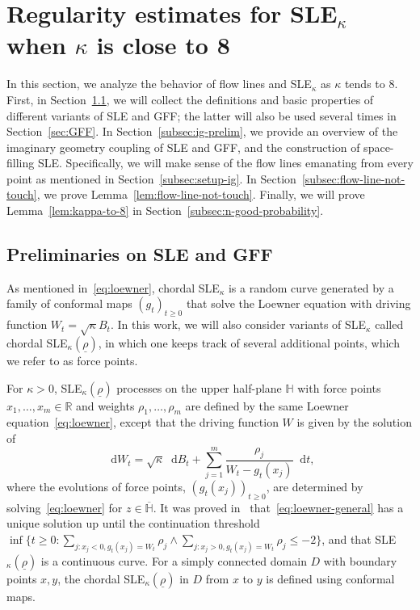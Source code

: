 \documentclass[a4paper]{article}
\numberwithin{equation}{section}
\numberwithin{equation}{section}
\renewcommand{\1}{\mathbf{1}}
\newcommand\dd{\mathop{}\!\mathrm{d}} %
\begin{document}
\section{Regularity estimates for SLE$_\kappa$ when $\kappa$ is close to 8}\label{sec:SLE}

In this section, we analyze the behavior of flow lines and SLE$_\kappa$ as $\kappa$ tends to 8. First, in Section~\ref{subsec:sle-gff-prelim}, we will collect the definitions and basic properties of different variants of SLE and GFF; the latter will also be used several times in Section~\ref{sec:GFF}. In Section~\ref{subsec:ig-prelim}, we provide an overview of the imaginary geometry coupling of SLE and GFF, and the construction of space-filling SLE. Specifically, we will make sense of the flow lines emanating from every point as mentioned in Section~\ref{subsec:setup-ig}. In Section~\ref{subsec:flow-line-not-touch}, we prove Lemma~\ref{lem:flow-line-not-touch}. Finally, we will prove Lemma~\ref{lem:kappa-to-8} in Section~\ref{subsec:n-good-probability}.

\subsection{Preliminaries on SLE and GFF}\label{subsec:sle-gff-prelim}

As mentioned in~\eqref{eq:loewner}, chordal SLE$_\kappa$ is a random curve generated by a family of conformal maps $(g_t)_{t \ge 0}$ that solve the Loewner equation with driving function $W_t=\sqrt{\kappa} B_t$. In this work, we will also consider variants of SLE$_\kappa$ called chordal SLE$_\kappa(\underline{\rho})$, in which one keeps track of several additional points, which we refer to as force points.

For $\kappa>0$, SLE$_\kappa(\underline{\rho})$ processes on the upper half-plane $\mathbb H$ with force points $x_1,\ldots,x_m \in \mathbb{R}$ and weights $\rho_1,\ldots,\rho_m$ are defined by the same Loewner equation~\eqref{eq:loewner}, except that the driving function $W$ is given by the solution of
\begin{equation}\label{eq:loewner-general}
    \dd W_t=\sqrt{\kappa} \dd B_t+\sum_{j=1}^m \frac{\rho_j}{W_t-g_t(x_j)} \dd t,
\end{equation}
where the evolutions of force points, $(g_t(x_j))_{t \ge 0}$, are determined by solving~\eqref{eq:loewner} for $z \in \overline{\mathbb H}$. It was proved in~\cite{IG1} that~\eqref{eq:loewner-general} has a unique solution up until the continuation threshold $\inf\{t \ge 0:\sum_{j:x_j<0, g_t(x_j)=W_t} \rho_j \wedge \sum_{j:x_j>0, g_t(x_j)=W_t} \rho_j \le -2\}$, and that SLE$_\kappa(\underline{\rho})$ is a continuous curve. For a simply connected domain $D$ with boundary points $x,y$, the chordal SLE$_\kappa(\underline{\rho})$ in $D$ from $x$ to $y$ is defined using conformal maps.
\end{document}
